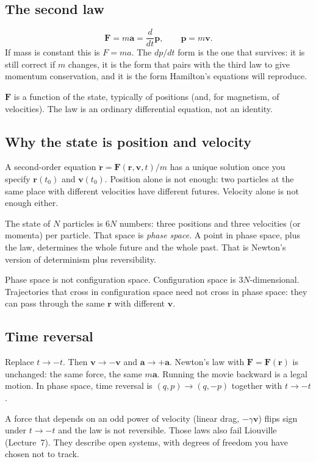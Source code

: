 \documentclass[11pt]{article}
\numberwithin{equation}{section}
\newcommand{\ddt}{\frac{d}{dt}}
\newcommand{\vect}[1]{\mathbf{#1}}
\begin{document}
\subsection{The second law}

\[
\vect{F} = m\vect{a} = \ddt\vect{p},\qquad \vect{p} = m\vect{v}.
\]
If mass is constant this is $F=ma$. The $dp/dt$ form is the one that survives: it is still correct if $m$ changes, it is the form that pairs with the third law to give momentum conservation, and it is the form Hamilton's equations will reproduce.

$\vect{F}$ is a function of the state, typically of positions (and, for magnetism, of velocities). The law is an ordinary differential equation, not an identity.

\subsection{Why the state is position and velocity}

A second-order equation $\ddot{\vect{r}}=\vect{F}(\vect{r},\vect{v},t)/m$ has a unique solution once you specify $\vect{r}(t_0)$ and $\vect{v}(t_0)$. Position alone is not enough: two particles at the same place with different velocities have different futures. Velocity alone is not enough either.

The state of $N$ particles is $6N$ numbers: three positions and three velocities (or momenta) per particle. That space is \emph{phase space}. A point in phase space, plus the law, determines the whole future and the whole past. That is Newton's version of determinism plus reversibility.

Phase space is not configuration space. Configuration space is $3N$-dimensional. Trajectories that cross in configuration space need not cross in phase space: they can pass through the same $\vect{r}$ with different $\vect{v}$.

\subsection{Time reversal}

Replace $t\to -t$. Then $\vect{v}\to -\vect{v}$ and $\vect{a}\to +\vect{a}$. Newton's law with $\vect{F}=\vect{F}(\vect{r})$ is unchanged: the same force, the same $m\vect{a}$. Running the movie backward is a legal motion. In phase space, time reversal is $(q,p)\to(q,-p)$ together with $t\to -t$.

A force that depends on an odd power of velocity (linear drag, $-\gamma\vect{v}$) flips sign under $t\to -t$ and the law is not reversible. Those laws also fail Liouville (Lecture~7). They describe open systems, with degrees of freedom you have chosen not to track.
\end{document}
